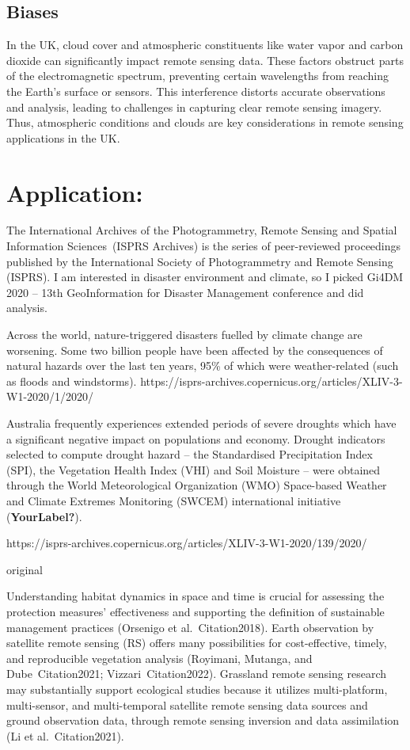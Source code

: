 \documentclass[
  letterpaper,
  DIV=11,
  numbers=noendperiod]{scrreprt}
\begin{document}
\section{Biases}\label{biases}

In the UK, cloud cover and atmospheric constituents like water vapor and
carbon dioxide can significantly impact remote sensing data. These
factors obstruct parts of the electromagnetic spectrum, preventing
certain wavelengths from reaching the Earth's surface or sensors. This
interference distorts accurate observations and analysis, leading to
challenges in capturing clear remote sensing imagery. Thus, atmospheric
conditions and clouds are key considerations in remote sensing
applications in the UK.


\chapter{Application:}\label{application}

The International Archives of the Photogrammetry, Remote Sensing and
Spatial Information Sciences~(ISPRS Archives) is the series of
peer-reviewed proceedings published by the International Society of
Photogrammetry and Remote Sensing (ISPRS). I am interested in disaster
environment and climate, so I picked Gi4DM 2020 -- 13th GeoInformation
for Disaster Management conference and did analysis.

Across the world, nature-triggered disasters fuelled by climate change
are worsening. Some two billion people have been affected by the
consequences of natural hazards over the last ten years, 95\% of which
were weather-related (such as floods and windstorms).
https://isprs-archives.copernicus.org/articles/XLIV-3-W1-2020/1/2020/

Australia frequently experiences extended periods of severe droughts
which have a significant negative impact on populations and economy.
Drought indicators selected to compute drought hazard -- the
Standardised Precipitation Index (SPI), the Vegetation Health Index
(VHI) and Soil Moisture -- were obtained through the World
Meteorological Organization (WMO) Space-based Weather and Climate
Extremes Monitoring (SWCEM) international initiative
(\textbf{YourLabel?}).

https://isprs-archives.copernicus.org/articles/XLIV-3-W1-2020/139/2020/

original

Understanding habitat dynamics in space and time is crucial for
assessing the protection measures' effectiveness and supporting the
definition of sustainable management practices (Orsenigo et
al.~Citation2018). Earth observation by satellite remote sensing (RS)
offers many possibilities for cost-effective, timely, and reproducible
vegetation analysis (Royimani, Mutanga, and Dube~Citation2021;
Vizzari~Citation2022). Grassland remote sensing research may
substantially support ecological studies because it utilizes
multi-platform, multi-sensor, and multi-temporal satellite remote
sensing data sources and ground observation data, through remote sensing
inversion and data assimilation (Li et al.~Citation2021).
\end{document}
